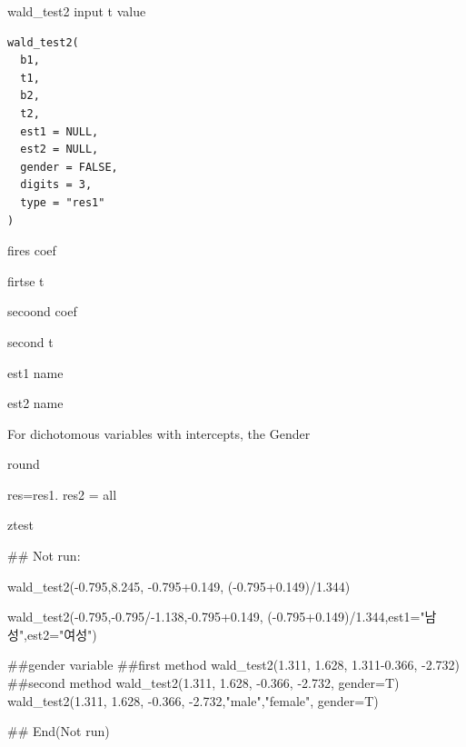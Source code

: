 \documentclass[a4paper]{book}
\begin{document}
%
\begin{Description}
wald\_test2 input t value
\end{Description}
%
\begin{Usage}
\begin{verbatim}
wald_test2(
  b1,
  t1,
  b2,
  t2,
  est1 = NULL,
  est2 = NULL,
  gender = FALSE,
  digits = 3,
  type = "res1"
)
\end{verbatim}
\end{Usage}
%
\begin{Arguments}
\begin{ldescription}
\item[\code{b1}] fires coef

\item[\code{t1}] firtse t

\item[\code{b2}] secoond coef

\item[\code{t2}] second t

\item[\code{est1}] est1 name

\item[\code{est2}] est2 name

\item[\code{gender}] For dichotomous variables with intercepts, the Gender

\item[\code{digits}] round

\item[\code{type}] res=res1. res2 = all
\end{ldescription}
\end{Arguments}
%
\begin{Value}
ztest
\end{Value}
%
\begin{Examples}
\begin{ExampleCode}
## Not run: 

wald_test2(-0.795,8.245, -0.795+0.149,  (-0.795+0.149)/1.344)

wald_test2(-0.795,-0.795/-1.138,-0.795+0.149,
           (-0.795+0.149)/1.344,est1="남성",est2="여성")


##gender variable
##first method
wald_test2(1.311, 1.628, 1.311-0.366,  -2.732)
##second method
wald_test2(1.311, 1.628, -0.366,  -2.732, gender=T)
wald_test2(1.311, 1.628, -0.366,  -2.732,"male","female", gender=T)


## End(Not run)



\end{ExampleCode}
\end{Examples}
\end{document}
